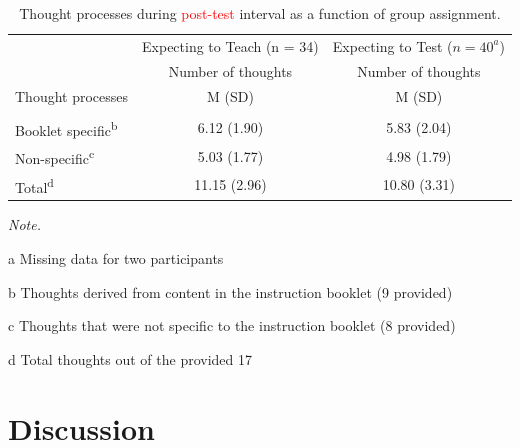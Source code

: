 \documentclass[
  english,
  man,floatsintext]{apa7}
\begin{document}
\begin{table}

\caption{\label{tab:table5}Thought processes during \textcolor{red}{post-test} interval as a function of group assignment.}
\fontsize{11}{13}\selectfont
\begin{threeparttable}
\begin{tabular}[t]{lcc}
\toprule
\multicolumn{1}{c}{ } & \multicolumn{1}{c}{Expecting to Teach (n = 34)} & \multicolumn{1}{c}{Expecting to Test ($n = 40^{a}$)} \\
\cmidrule(l{3pt}r{3pt}){2-2} \cmidrule(l{3pt}r{3pt}){3-3}
\multicolumn{1}{c}{ } & \multicolumn{1}{c}{Number of thoughts} & \multicolumn{1}{c}{Number of thoughts} \\
\cmidrule(l{3pt}r{3pt}){2-2} \cmidrule(l{3pt}r{3pt}){3-3}
Thought processes & M (SD) & M (SD)\\
\midrule
\addlinespace[0.3em]
\multicolumn{3}{l}{\textbf{Engaged in thoughts}}\\
\hspace{1em}Booklet specific\textsuperscript{b} & 6.12 (1.90) & 5.83 (2.04)\\
\hspace{1em}Non-specific\textsuperscript{c} & 5.03 (1.77) & 4.98 (1.79)\\
\hspace{1em}Total\textsuperscript{d} & 11.15 (2.96) & 10.80 (3.31)\\
\bottomrule
\end{tabular}
\begin{tablenotes}
\item \textit{Note.} 
\item[a] Missing data for two participants
\item[b] Thoughts derived from content in the instruction booklet (9 provided)
\item[c] Thoughts that were not specific to the instruction booklet (8 provided)
\item[d] Total thoughts out of the provided 17
\end{tablenotes}
\end{threeparttable}
\end{table}

\vspace{2em}

\hypertarget{discussion}{%
\section{Discussion}\label{discussion}}
\end{document}
